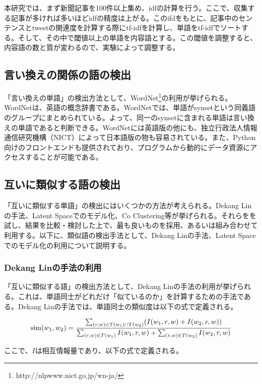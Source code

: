 \documentclass[12pt]{jarticle}
\begin{document}
本研究では、まず新聞記事を100件以上集め、idfの計算を行う。ここで、収集する記事が多ければ多いほどidfの精度は上がる。このifdをもとに、記事中のセンテンスとtweetの関連度を計算する際にtf-idfを計算し、単語をtf-idfでソートする。そして、その中で閾値以上の単語を内容語とする。この閾値を調整すると、内容語の数と質が変わるので、実験によって調整する。

\subsection{言い換えの関係の語の検出}
  「言い換えの単語」の検出方法として、WordNet\footnote{http://nlpwww.nict.go.jp/wn-ja/}の利用が挙げられる。WordNetは、英語の概念辞書である。WordNetでは、単語がsynsetという同義語のグループにまとめられている。よって、同一のsynsetに含まれる単語は言い換えの単語であると判断できる。WordNetには英語版の他にも、独立行政法人情報通信研究機構（NICT）によって日本語版の物も容易されている。また、Python向けのフロントエンドも提供されており、プログラムから動的にデータ資源にアクセスすることが可能である。

\subsection{互いに類似する語の検出}
「互いに類似する単語」の検出にはいくつかの方法が考えられる。Dekang Linの手法\cite{DekangLin}、Latent Spaceでのモデル化\cite{LatentSpace}、Co Clustering\cite{CoClustering}等が挙げられる。それらをを試し、結果を比較・検討した上で、最も良いものを採用、あるいは組み合わせて利用する。以下に、類似語の検出手法として、Dekang Linの手法、Latent Spaceでのモデル化の利用について説明する。

\subsubsection{Dekang Linの手法の利用}
「互いに類似する語」の検出方法として、Dekang Linの手法\cite{DekangLin}の利用が挙げられる。これは、単語同士がどれだけ「似ているのか」を計算するための手法である。Dekang Linの手法では、単語同士の類似度は以下の式で定義される。

\begin{equation}
  {\rm sim}(w_1, w_2) = \frac{\sum_{(r,w)\in T(w_1)\cap T(w_2)} (I(w_1, r, w) + I(w_2, r, w))}{\sum_{(r,w) \in T(w_1)}I(w_1, r, w) + \sum_{(r,w) \in T(w_2)}I(w_2, r, w)}
\end{equation}

ここで、$I$は相互情報量であり、以下の式で定義される。
\end{document}
